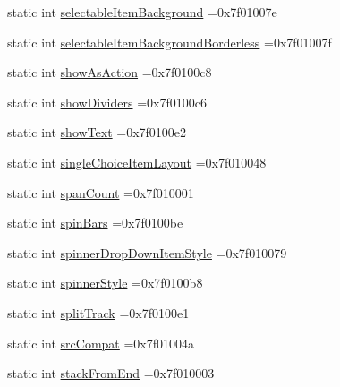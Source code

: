 \begin{DoxyCompactItemize}
\item 
static int \hyperlink{classandroid_1_1support_1_1graphics_1_1drawable_1_1animated_1_1R_1_1attr_a571ffe0df6b2041deced5b131ba0892d}{selectable\+Item\+Background} =0x7f01007e
\item 
static int \hyperlink{classandroid_1_1support_1_1graphics_1_1drawable_1_1animated_1_1R_1_1attr_aa9b8121a8dcbe59febd13c53f23b5faa}{selectable\+Item\+Background\+Borderless} =0x7f01007f
\item 
static int \hyperlink{classandroid_1_1support_1_1graphics_1_1drawable_1_1animated_1_1R_1_1attr_a331e00669a6d6731aa9689c0c8f9299c}{show\+As\+Action} =0x7f0100c8
\item 
static int \hyperlink{classandroid_1_1support_1_1graphics_1_1drawable_1_1animated_1_1R_1_1attr_ababee2ff4457978b53b480105be60ac4}{show\+Dividers} =0x7f0100c6
\item 
static int \hyperlink{classandroid_1_1support_1_1graphics_1_1drawable_1_1animated_1_1R_1_1attr_a915eecfe502f30b2aca546b7b54634cc}{show\+Text} =0x7f0100e2
\item 
static int \hyperlink{classandroid_1_1support_1_1graphics_1_1drawable_1_1animated_1_1R_1_1attr_afa4abea97d90906b32b3a4c1470bb756}{single\+Choice\+Item\+Layout} =0x7f010048
\item 
static int \hyperlink{classandroid_1_1support_1_1graphics_1_1drawable_1_1animated_1_1R_1_1attr_a6f33c0ffc42e5387522c43da4bc94897}{span\+Count} =0x7f010001
\item 
static int \hyperlink{classandroid_1_1support_1_1graphics_1_1drawable_1_1animated_1_1R_1_1attr_a1615810d6366173fb37dc5c1428adc36}{spin\+Bars} =0x7f0100be
\item 
static int \hyperlink{classandroid_1_1support_1_1graphics_1_1drawable_1_1animated_1_1R_1_1attr_a007a7d728008b624ade8c004ef8174f6}{spinner\+Drop\+Down\+Item\+Style} =0x7f010079
\item 
static int \hyperlink{classandroid_1_1support_1_1graphics_1_1drawable_1_1animated_1_1R_1_1attr_a8763aef2ad8c5697bc87f69d6e5f407a}{spinner\+Style} =0x7f0100b8
\item 
static int \hyperlink{classandroid_1_1support_1_1graphics_1_1drawable_1_1animated_1_1R_1_1attr_a9fafb32db5b6d6ead09f6e5044e837f2}{split\+Track} =0x7f0100e1
\item 
static int \hyperlink{classandroid_1_1support_1_1graphics_1_1drawable_1_1animated_1_1R_1_1attr_ae34c879d1fbb43eafabfe58b2bbde3a8}{src\+Compat} =0x7f01004a
\item 
static int \hyperlink{classandroid_1_1support_1_1graphics_1_1drawable_1_1animated_1_1R_1_1attr_a8c29656aa71891095bd178c4b06eb8d0}{stack\+From\+End} =0x7f010003

\end{DoxyCompactItemize}
